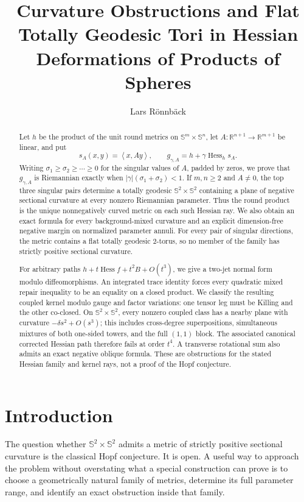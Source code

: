 \documentclass[11pt]{amsart}
\title[Curvature obstructions and flat tori]{Curvature Obstructions and Flat Totally Geodesic Tori in Hessian Deformations of Products of Spheres}
\author{Lars R\"onnb\"ack}
\date{}
\theoremstyle{definition}
\theoremstyle{remark}
\DeclareMathOperator{\Hess}{Hess}
\newcommand{\R}{\mathbb R}
\newcommand{\Sph}{\mathbb S}
\newcommand{\ip}[2]{\left\langle #1,#2\right\rangle}
\begin{document}
\begin{abstract}
Let $h$ be the product of the unit round metrics on
$\Sph^m\times\Sph^n$, let $A:\R^{n+1}\to\R^{m+1}$ be linear, and put
\[
 s_A(x,y)=\ip{x}{Ay},\qquad
 g_{\gamma,A}=h+\gamma\Hess_h s_A.
\]
Writing $\sigma_1\geq\sigma_2\geq\cdots\geq0$ for the singular values
of $A$, padded by zeros, we prove that $g_{\gamma,A}$ is Riemannian
exactly when $|\gamma|(\sigma_1+\sigma_2)<1$.  If $m,n\geq2$ and
$A\neq0$, the top three singular pairs determine a totally geodesic
$\Sph^2\times\Sph^2$ containing a plane of negative sectional
curvature at every nonzero Riemannian parameter.  Thus the round
product is the unique nonnegatively curved metric on each such
Hessian ray.  We also obtain an exact formula for every
background-mixed curvature and an explicit dimension-free negative
margin on normalized parameter annuli.  For every pair of singular
directions, the metric contains a flat totally geodesic $2$-torus, so
no member of the family has strictly positive sectional curvature.

For arbitrary paths $h+t\Hess f+t^2B+O(t^3)$, we give a two-jet normal
form modulo diffeomorphisms.  An integrated trace identity forces every
quadratic mixed repair inequality to be an equality on a closed
product.  We classify the resulting coupled kernel modulo gauge and
factor variations: one tensor leg must be Killing and the other
co-closed.  On $\Sph^2\times\Sph^2$, every nonzero coupled class has a
nearby plane with curvature $-\delta s^2+O(s^3)$; this includes
cross-degree superpositions, simultaneous mixtures of both one-sided
towers, and the full $(1,1)$ block.  The associated canonical
corrected Hessian path therefore fails at order $t^4$.  A transverse
rotational sum also admits an exact negative oblique formula.  These
are obstructions for the stated Hessian family and kernel rays, not a
proof of the Hopf conjecture.
\end{abstract}

\maketitle

\section{Introduction}

The question whether $\Sph^2\times\Sph^2$ admits a metric of strictly
positive sectional curvature is the classical Hopf conjecture.  It is
open.  A useful way to approach the problem without overstating what a
special construction can prove is to choose a geometrically natural
family of metrics, determine its full parameter range, and identify an
exact obstruction inside that family.
\end{document}
